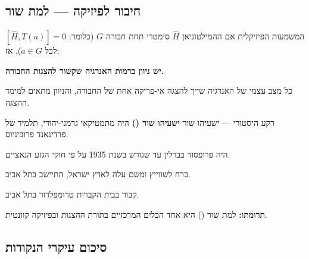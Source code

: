 \subsection{חיבור לפיזיקה — למת שור}

\begin{importantbox}{המשמעות הפיזיקלית}
אם ההמילטוניאן $\hat{H}$ סימטרי תחת חבורה $G$ (כלומר: $[\hat{H}, T(a)] = 0$ לכל $a \in G$), אז:

\textbf{יש ניוון ברמות האנרגיה שקשור להצגות החבורה.}

כל מצב עצמי של האנרגיה שייך להצגה אי-פריקה אחת של החבורה, והניוון מתאים למימד ההצגה.
\end{importantbox}

\begin{notebox}{רקע היסטורי — ישעיהו שור}
    \textbf{ישעיהו שור ()} היה מתמטיקאי גרמני-יהודי, תלמיד של פרדינאנד פרוביניוס.

היה פרופסור בברלין עד שגורש בשנת 1935 על פי חוקי הגזע הנאציים. 

ברח לשווייץ ומשם עלה לארץ ישראל, התיישב בתל אביב.

קבור בבית הקברות טרומפלדור בתל אביב.

    \textbf{תרומתו:} למת שור () היא אחד הכלים המרכזיים בתורת ההצגות ובפיזיקה קוונטית.
\end{notebox}

\subsection{סיכום עיקרי הנקודות}

